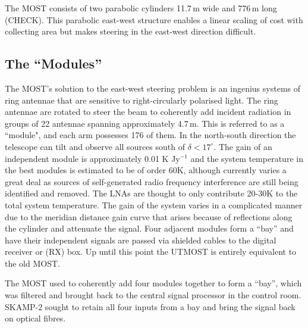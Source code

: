 
The MOST consists of two parabolic cylinders 11.7\,m wide and 776\,m long (CHECK). This parabolic east-west structure enables a linear scaling of cost with collecting area but makes steering in the east-west direction difficult.

\subsection{The ``Modules''}
The MOST's solution to the east-west steering problem is an ingenius systems of ring antennae that are sensitive to right-circularly polarised light. The ring antennae are rotated to steer the beam to coherently add incident radiation in groups of 22 antennae spanning approximately 4.7\,m. This is referred to as a ``module", and each arm possesses 176 of them. In the north-south direction the telescope can tilt and observe all sources south of $\delta<17^\circ$. The gain of an independent module is approximately 0.01 K Jy$^{-1}$ and the system temperature in the best modules is estimated to be of order 60K, although currently varies a great deal as sources of self-generated radio frequency interference are still being identified and removed. The LNAs are thought to only contribute 20-30K to the total system temperature.
The gain of the system varies in a complicated manner due to the meridian distance gain curve that arises because of reflections along the cylinder and attenuate the signal\cite{Hunstead_1996}.
Four adjacent modules form a ``bay'' and have their independent signals are passed via shielded cables to the digital receiver or (RX) box. Up until this point the UTMOST is entirely equivalent to the old MOST.

The MOST used to coherently add four modules together to form a ``bay'', which was filtered and brought back to the central signal processor in the control room. SKAMP-2 sought to retain all four inputs from a bay and bring the signal back on optical fibres.
